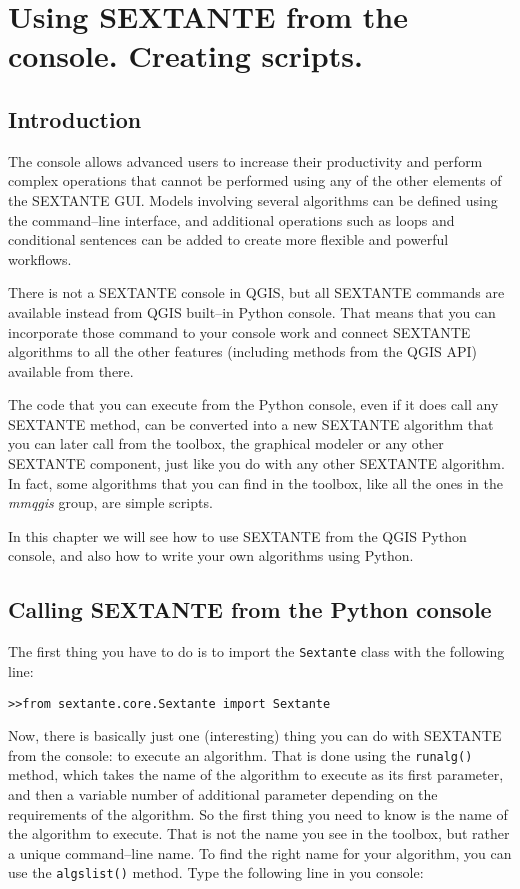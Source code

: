 \chapter{Using SEXTANTE from the console. Creating scripts.}

\section{Introduction}

The console allows advanced users to increase their productivity and perform complex operations that cannot be performed using any of the other elements of the SEXTANTE GUI. Models involving several algorithms can be defined using the command--line interface, and additional operations such as loops and conditional sentences can be added to create more flexible and powerful workflows.

There is not a SEXTANTE console in QGIS, but all SEXTANTE commands are available instead from QGIS built--in Python console. That means that you can incorporate those command to your console work and connect SEXTANTE algorithms to all the other features (including methods from the QGIS API) available from there.

The code that you can execute from the Python console, even if it does call any SEXTANTE method, can be converted into a new  SEXTANTE algorithm that you can later call from the toolbox, the graphical modeler or any other SEXTANTE component, just like you do with any other SEXTANTE algorithm. In fact, some algorithms that you can find in the toolbox, like all the ones in the \emph{mmqgis} group, are simple scripts.

In this chapter we will see how to use SEXTANTE from the QGIS Python console, and also how to write your own algorithms using Python.


\section{Calling SEXTANTE from the Python console}

The first thing you have to do is to import the \texttt{Sextante} class with the following line:

\begin{verbatim}
>>from sextante.core.Sextante import Sextante
\end{verbatim}

Now, there is basically just one (interesting) thing you can do with SEXTANTE from the console: to execute an algorithm. That is done using the \texttt{runalg()} method, which takes the name of the algorithm to execute as its first parameter, and then a variable number of additional parameter depending on the requirements of the algorithm. So the first thing you need to know is the name of the algorithm to execute. That is not the name you see in the toolbox, but rather a unique command--line name. To find the right name for your algorithm, you can use the \texttt{algslist()} method. Type the following line in you console:

